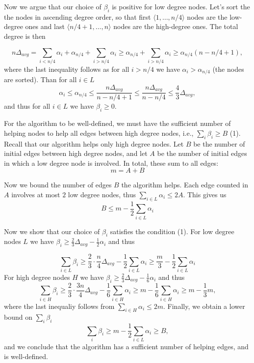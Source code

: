 \documentclass{article}
\begin{document}
\medskip

Now we argue that our choice of $\beta_i$ is positive for low degree nodes.
Let's sort the the nodes in ascending degree order, so that first
$\langle 1, \ldots, n/4\rangle$ nodes are the low-degree ones and
last $\langle n/4 +1, \ldots, n\rangle$ nodes are the high-degree ones.
The total degree is then

$$n\Delta_{avg} = \sum_{i < n/4} \alpha_i + \alpha_{n/4} + \sum_{i > n/4} \alpha_i \geq \alpha_{n/4} + \sum_{i > n/4} \alpha_i \geq \alpha_{n/4}(n-n/4+1),$$
where the last inequality follows as 
for all $i > n/4$ we have $\alpha_i > \alpha_{n/4}$ (the nodes are sorted).
Than for all $i \in L$
$$\alpha_i \leq \alpha_{n/4} \leq \frac{n\Delta_{avg}}{n-n/4+1} \leq \frac{n\Delta_{avg}}{n-n/4} \leq \frac{4}{3}\Delta_{avg},$$
and thus for all $i \in L$ we have $\beta_i \geq 0$.

For the algorithm to be well-defined, we must have the sufficient
number of helping nodes to help all edges between high degree nodes,
i.e., $\sum_i \beta_i \geq B$ (1).
Recall that our algorithm helps only high degree nodes.
Let $B$ be the number of initial edges between high degree nodes, and let $A$ be the number of initial edges in which a low degree node is involved.
In total, these sum to all edges:
$$m = A + B$$

Now we bound the number of edges $B$ the algorithm helps.
Each edge counted in $A$ involves at most $2$ low degree nodes, thus
$\sum_{i \in L}\alpha_i \leq 2A$.
This gives us
$$B \leq m - \frac{1}{2}\sum_{i \in L}\alpha_i$$

Now we show that our choice of $\beta_i$ satisfies the condition (1).
For low degree nodes $L$ we have   $\beta_i \geq \frac{2}{3}\Delta_{avg}-\frac{1}{2}\alpha_i$
and thus

  $$\sum_{i \in L}\beta_i \geq \frac{2}{3}\cdot\frac{n}{4}\Delta_{avg} - \frac{1}{2}\sum_{i \in L}\alpha_i \geq \frac{m}{3} - \frac{1}{2}\sum_{i \in L}\alpha_i$$
  For high degree nodes $H$ we have 
  $\beta_i \geq \frac{2}{3}\Delta_{avg}-\frac{1}{6}\alpha_i$
  and thus
  $$\sum_{i \in H}\beta_i \geq \frac{2}{3}\cdot\frac{3n}{4}\Delta_{avg} - \frac{1}{6}\sum_{i \in H}\alpha_i \geq m - \frac{1}{6}\sum_{i \in H}\alpha_i \geq m - \frac{1}{3}m,$$
  where the last inequaliy follows from $\sum_{i \in H}\alpha_i \leq 2m$.
Finally, we obtain a lower bound on
$\sum_{i}\beta_i$
$$\sum_{i}\beta_i \geq m - \frac{1}{2}\sum_{i \in L}\alpha_i \geq B,$$
and we conclude that the algorithm has a sufficient number of
helping edges, and is well-defined.
\end{document}
